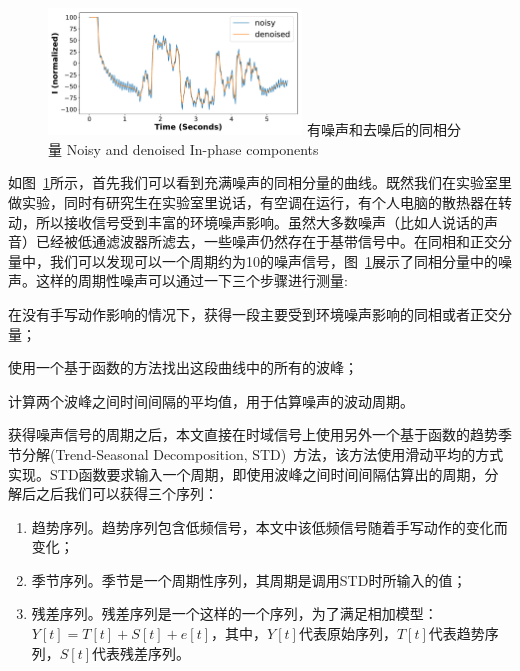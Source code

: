 \begin{figure}[!htp]
  \centering
  \includegraphics[width=0.6\textwidth]{figure/noisy-I.pdf}
  \bicaption
    {有噪声和去噪后的同相分量}
    {Noisy and denoised In-phase components}
  \label{fig:noisy-denoised-component}
\end{figure}
如图~\ref{fig:noisy-denoised-component}所示，首先我们可以看到充满噪声的同相分量的曲线。既然我们在实验室里做实验，同时有研究生在实验室里说话，有空调在运行，有个人电脑的散热器在转动，所以接收信号受到丰富的环境噪声影响。虽然大多数噪声（比如人说话的声音）已经被低通滤波器所滤去，一些噪声仍然存在于基带信号中。在同相和正交分量中，我们可以发现可以一个周期约为10的噪声信号，图~\ref{fig:noisy-denoised-component}展示了同相分量中的噪声。这样的周期性噪声可以通过一下三个步骤进行测量:
\begin{enumerate*}[label=(\arabic*)]
    \item 在没有手写动作影响的情况下，获得一段主要受到环境噪声影响的同相或者正交分量；
    \item 使用一个基于函数的方法找出这段曲线中的所有的波峰；
    \item 计算两个波峰之间时间间隔的平均值，用于估算噪声的波动周期。
\end{enumerate*}
获得噪声信号的周期之后，本文直接在时域信号上使用另外一个基于函数的趋势季节分解(Trend-Seasonal Decomposition, STD)~\cite{cleveland1990stl}方法，该方法使用滑动平均的方式实现。STD函数要求输入一个周期，即使用波峰之间时间间隔估算出的周期，分解后之后我们可以获得三个序列：
\begin{enumerate}[label=(\arabic*)]
    \item 趋势序列。趋势序列包含低频信号，本文中该低频信号随着手写动作的变化而变化；
    \item 季节序列。季节是一个周期性序列，其周期是调用STD时所输入的值；
    \item 残差序列。残差序列是一个这样的一个序列，为了满足相加模型：$Y[t] = T[t] + S[t] + e[t]$，其中，$Y[t]$代表原始序列，$T[t]$代表趋势序列，$S[t]$代表残差序列。
\end{enumerate}

